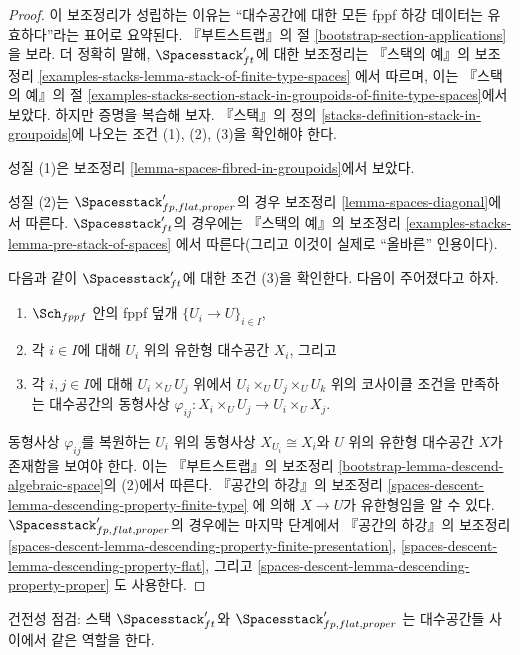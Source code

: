 \begin{proof}
이 보조정리가 성립하는 이유는 ``대수공간에 대한 모든 fppf 하강 데이터는
유효하다''라는 표어로 요약된다. 『부트스트랩』의 절
\ref{bootstrap-section-applications}을 보라. 더 정확히 말해,
$\Spacesstack'_{ft}$에 대한 보조정리는 『스택의 예』의 보조정리
\ref{examples-stacks-lemma-stack-of-finite-type-spaces}
에서 따르며, 이는 『스택의 예』의 절
\ref{examples-stacks-section-stack-in-groupoids-of-finite-type-spaces}에서 보았다.
하지만 증명을 복습해 보자. 『스택』의 정의
\ref{stacks-definition-stack-in-groupoids}에 나오는 조건 (1), (2), (3)을
확인해야 한다.

\medskip\noindent
성질 (1)은 보조정리 \ref{lemma-spaces-fibred-in-groupoids}에서 보았다.

\medskip\noindent
성질 (2)는 $\Spacesstack'_{fp, flat, proper}$의 경우 보조정리
\ref{lemma-spaces-diagonal}에서 따른다. $\Spacesstack'_{ft}$의 경우에는
『스택의 예』의 보조정리
\ref{examples-stacks-lemma-pre-stack-of-spaces}
에서 따른다(그리고 이것이 실제로 ``올바른'' 인용이다).

\medskip\noindent
다음과 같이 $\Spacesstack'_{ft}$에 대한 조건 (3)을 확인한다. 다음이 주어졌다고 하자.
\begin{enumerate}
\item $\Sch_{fppf}$ 안의 fppf 덮개 $\{U_i \to U\}_{i \in I}$,
\item 각 $i \in I$에 대해 $U_i$ 위의 유한형 대수공간 $X_i$, 그리고
\item 각 $i, j \in I$에 대해 $U_i \times_U U_j$ 위에서
$U_i \times_U U_j \times_U U_k$ 위의 코사이클 조건을 만족하는 대수공간의 동형사상
$\varphi_{ij} : X_i \times_U U_j \to U_i \times_U X_j$.
\end{enumerate}
동형사상 $\varphi_{ij}$를 복원하는 $U_i$ 위의 동형사상
$X_{U_i} \cong X_i$와 $U$ 위의 유한형 대수공간 $X$가 존재함을 보여야 한다.
이는 『부트스트랩』의 보조정리
\ref{bootstrap-lemma-descend-algebraic-space}의 (2)에서 따른다.
『공간의 하강』의 보조정리
\ref{spaces-descent-lemma-descending-property-finite-type}
에 의해 $X \to U$가 유한형임을 알 수 있다.
$\Spacesstack'_{fp, flat, proper}$의 경우에는 마지막 단계에서 『공간의 하강』의
보조정리
\ref{spaces-descent-lemma-descending-property-finite-presentation},
\ref{spaces-descent-lemma-descending-property-flat}, 그리고
\ref{spaces-descent-lemma-descending-property-proper}
도 사용한다.
\end{proof}

\noindent
건전성 점검: 스택 $\Spacesstack'_{ft}$와
$\Spacesstack'_{fp, flat, proper}$
는 대수공간들 사이에서 같은 역할을 한다.

